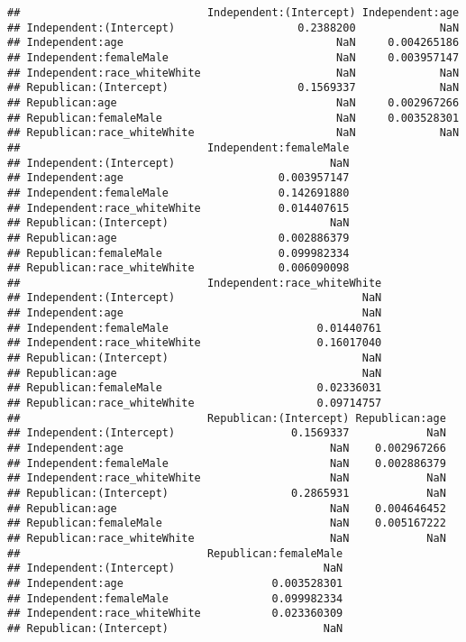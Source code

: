 \documentclass[]{article}
\begin{document}
\begin{verbatim}
##                             Independent:(Intercept) Independent:age
## Independent:(Intercept)                   0.2388200             NaN
## Independent:age                                 NaN     0.004265186
## Independent:femaleMale                          NaN     0.003957147
## Independent:race_whiteWhite                     NaN             NaN
## Republican:(Intercept)                    0.1569337             NaN
## Republican:age                                  NaN     0.002967266
## Republican:femaleMale                           NaN     0.003528301
## Republican:race_whiteWhite                      NaN             NaN
##                             Independent:femaleMale
## Independent:(Intercept)                        NaN
## Independent:age                        0.003957147
## Independent:femaleMale                 0.142691880
## Independent:race_whiteWhite            0.014407615
## Republican:(Intercept)                         NaN
## Republican:age                         0.002886379
## Republican:femaleMale                  0.099982334
## Republican:race_whiteWhite             0.006090098
##                             Independent:race_whiteWhite
## Independent:(Intercept)                             NaN
## Independent:age                                     NaN
## Independent:femaleMale                       0.01440761
## Independent:race_whiteWhite                  0.16017040
## Republican:(Intercept)                              NaN
## Republican:age                                      NaN
## Republican:femaleMale                        0.02336031
## Republican:race_whiteWhite                   0.09714757
##                             Republican:(Intercept) Republican:age
## Independent:(Intercept)                  0.1569337            NaN
## Independent:age                                NaN    0.002967266
## Independent:femaleMale                         NaN    0.002886379
## Independent:race_whiteWhite                    NaN            NaN
## Republican:(Intercept)                   0.2865931            NaN
## Republican:age                                 NaN    0.004646452
## Republican:femaleMale                          NaN    0.005167222
## Republican:race_whiteWhite                     NaN            NaN
##                             Republican:femaleMale
## Independent:(Intercept)                       NaN
## Independent:age                       0.003528301
## Independent:femaleMale                0.099982334
## Independent:race_whiteWhite           0.023360309
## Republican:(Intercept)                        NaN

\end{verbatim}
\end{document}
